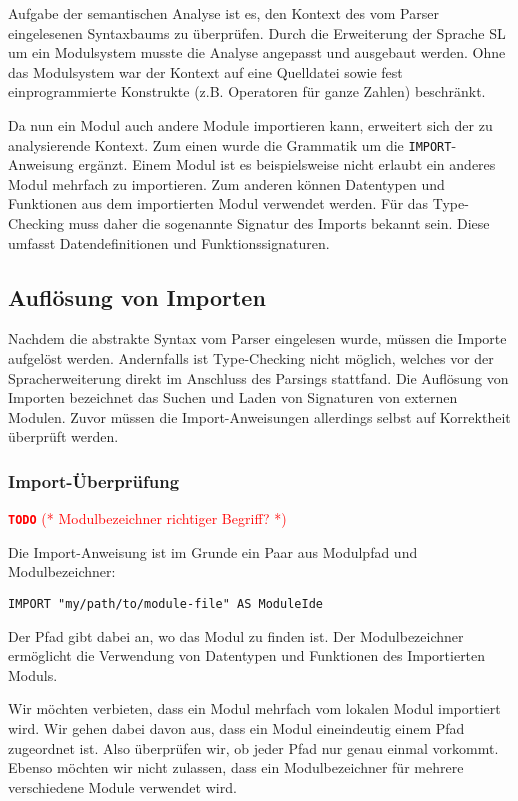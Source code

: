 \documentclass[runningheads]{llncs}
\newcommand{\TODO}[1]{ \textcolor{red}{\textbf{\texttt{\large{TODO}}} (* #1 *)}\par}
\begin{document}
Aufgabe der semantischen Analyse ist es, den Kontext des vom Parser eingelesenen Syntaxbaums zu überprüfen. Durch die Erweiterung der Sprache SL um ein Modulsystem musste die Analyse angepasst und ausgebaut werden. Ohne das Modulsystem war der Kontext auf eine Quelldatei sowie fest einprogrammierte Konstrukte (z.B. Operatoren für ganze Zahlen) beschränkt.

Da nun ein Modul auch andere Module importieren kann, erweitert sich der zu analysierende Kontext. Zum einen wurde die Grammatik um die \verb|IMPORT|-Anweisung ergänzt. Einem Modul ist es beispielsweise nicht erlaubt ein anderes Modul mehrfach zu importieren. Zum anderen können Datentypen und Funktionen aus dem importierten Modul verwendet werden. Für das Type-Checking muss daher die sogenannte Signatur des Imports bekannt sein. Diese umfasst Datendefinitionen und Funktionssignaturen.

\subsection{Auflösung von Importen}

Nachdem die abstrakte Syntax vom Parser eingelesen wurde, müssen die Importe aufgelöst werden. Andernfalls ist Type-Checking nicht möglich, welches vor der Spracherweiterung direkt im Anschluss des Parsings stattfand. Die Auflösung von Importen bezeichnet das Suchen und Laden von Signaturen von externen Modulen. Zuvor müssen die Import-Anweisungen allerdings selbst auf Korrektheit überprüft werden.

\subsubsection{Import-Überprüfung}

\TODO{Modulbezeichner richtiger Begriff?}

Die Import-Anweisung ist im Grunde ein Paar aus Modulpfad und Modulbezeichner:

\begin{verbatim}
IMPORT "my/path/to/module-file" AS ModuleIde
\end{verbatim}

Der Pfad gibt dabei an, wo das Modul zu finden ist. Der Modulbezeichner ermöglicht die Verwendung von Datentypen und Funktionen des Importierten Moduls.

Wir möchten verbieten, dass ein Modul mehrfach vom lokalen Modul importiert wird. Wir gehen dabei davon aus, dass ein Modul eineindeutig einem Pfad zugeordnet ist. Also überprüfen wir, ob jeder Pfad nur genau einmal vorkommt. Ebenso möchten wir nicht zulassen, dass ein Modulbezeichner für mehrere verschiedene Module verwendet wird.
\end{document}

